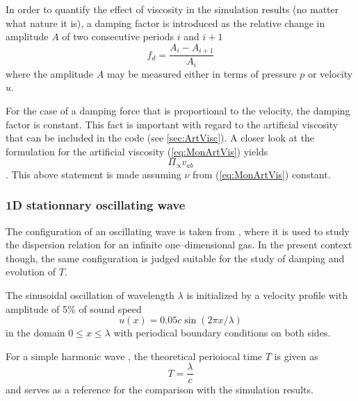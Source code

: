 \documentclass{report}
\begin{document}
In order to quantify the effect of viscosity in the simulation results (no matter what nature it is), a damping factor
is introduced as the relative change in amplitude $A$ of two consecutive periods $i$ and $i+1$
\begin{equation}
 f_d=\frac{A_i-A_{i+1}}{A_i}
\end{equation}
where the amplitude $A$ may be measured either in terms of pressure $p$ or velocity $u$.

For the case of a damping force that is proportional to the velocity, the damping factor
is constant. This fact is important with regard to the artificial viscosity that can be included in the code (see \ref{sec:ArtVisc}). A closer look at the formulation for the artificial viscosity (\ref{eq:MonArtVis}) yields
\begin{equation}
 \Pi_\propto v_{ab}
\end{equation}.
This above statement is made assuming $\nu$ from (\ref{eq:MonArtVis}) constant.



\subsubsection{1D stationnary oscillating wave}
The configuration of an oscillating wave is taken from \cite{Monaghan2005}, where it is used
to study the dispersion relation for an infinite one--dimensional gas. In the present context though, the same configuration is judged suitable for the study of damping and evolution of $T$. 

The sinusoidal oscillation of wavelength $\lambda$ is initialized by a velocity profile with amplitude of 5\% of sound speed
\begin{equation}
 u(x)=0.05 c\sin(2\pi x/\lambda)
\end{equation}
in the domain $0\leq x\leq \lambda$ with periodical boundary conditions on both sides.

For a simple harmonic wave , the theoretical perioiocal time $T$ is given as \cite{Stewart1930}
\begin{equation}
 T=\frac{\lambda}{c}
\end{equation}
and serves as a reference for the comparison with the simulation results.
\end{document}
